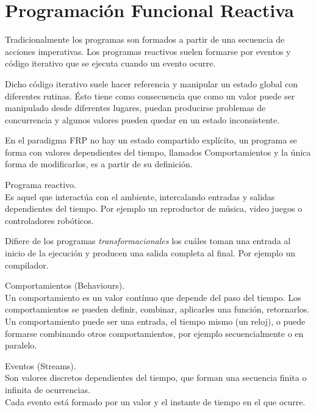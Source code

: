 



\section{Programación Funcional Reactiva}

Tradicionalmente los programas son formados a partir de
una secuencia de acciones imperativas. Los programas
reactivos suelen formarse por eventos y código iterativo
que se ejecuta cuando un evento ocurre.

Dicho código iterativo suele hacer referencia y manipular
un estado global con diferentes rutinas.
Ésto tiene como consecuencia que
como un valor puede ser manipulado desde diferentes lugares,
puedan producirse problemas de concurrencia y algunos valores
pueden quedar en un estado inconsistente.

En el paradigma FRP no hay un estado compartido explícito,
un programa se forma con valores dependientes del tiempo,
llamados Comportamientos y la única forma de modificarlos,
es a partir de su definición.


\begin{definicion}
Programa reactivo.\\
Es aquel que interactúa con el ambiente, intercalando entradas
y salidas dependientes del tiempo. Por ejemplo un reproductor
de música, video juegos o controladores robóticos.

Difiere de los programas \emph{transformacionales} los cuáles
toman una entrada al inicio de la ejecución y producen una salida
completa al final. Por ejemplo un compilador.
\end{definicion}

\begin{definicion}
Comportamientos (Behaviours).\\
Un comportamiento es un valor contínuo que depende del paso del tiempo.
Los comportamientos se pueden definir, combinar, aplicarles una
función, retornarlos.\\
Un comportamiento puede ser una entrada, el tiempo mismo (un reloj),
o puede formarse combinando otros comportamientos, por ejemplo secuencialmente
o en paralelo.
\end{definicion}

\begin{definicion}
Eventos (Streams).\\
Son valores discretos dependientes del tiempo, que forman
una secuencia finita o infinita de ocurrencias.\\
Cada evento está formado por un valor y
el instante de tiempo en el que ocurre.
\end{definicion}

